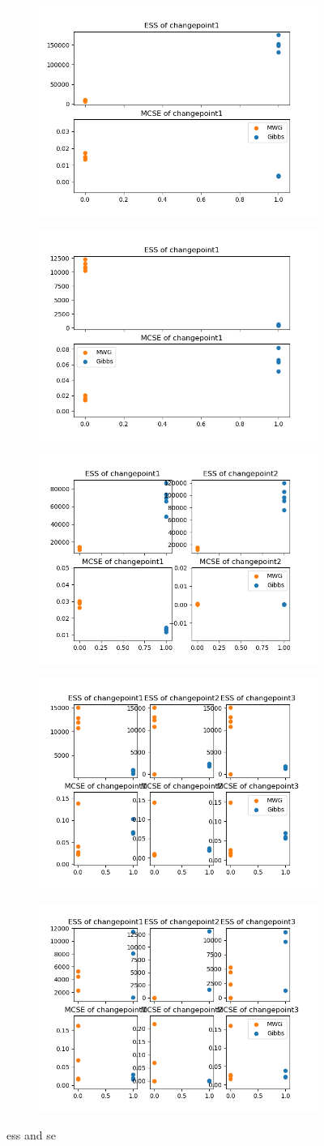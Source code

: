 \begin{figure}[h]
    \centering
    \begin{subfigure}
    	\centering
        \includegraphics[width=0.3\linewidth]{../../plots/ess_se_M2_N50_NMCMC1_seed0_diffind2.png}
    \end{subfigure}
    \begin{subfigure}
        \centering
    	\includegraphics[width=0.3\linewidth]{../../plots/ess_se_M2_N20000_NMCMC3_seed0_diffind2.png}
	\end{subfigure}
	\begin{subfigure}
	    \centering
    	\includegraphics[width=0.3\linewidth]{../../plots/ess_se_M3_N100_NMCMC3_seed0_diffind2.png}
	\end{subfigure}
	\begin{subfigure}
	    \centering
    	\includegraphics[width=0.3\linewidth]{../../plots/ess_se_M4_N100_NMCMC3_seed0_diffind2.png}
	\end{subfigure}
	\begin{subfigure}
	    \centering
    	\includegraphics[width=0.3\linewidth]{../../plots/ess_se_M4_N60_NMCMC3_seed0_diffind2.png}
	\end{subfigure}
	\caption{ess and se}
\end{figure}